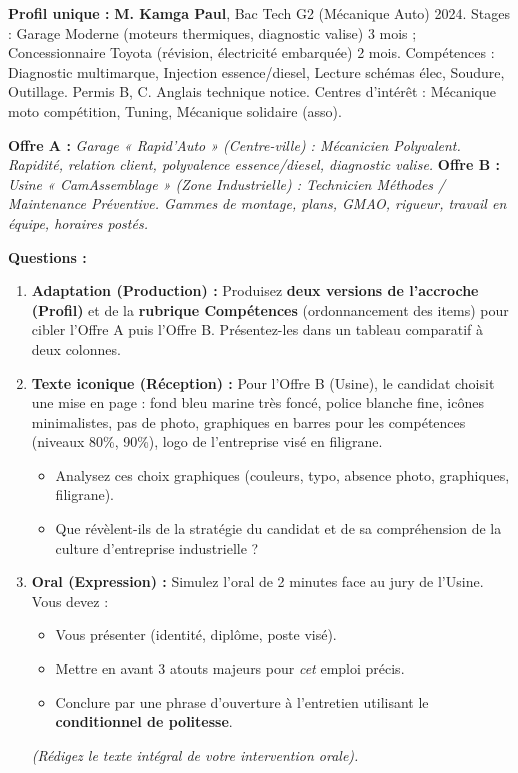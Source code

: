 \documentclass[11pt]{article}
\begin{document}
\begin{exercice}
\textbf{Profil unique :} \textbf{M. Kamga Paul}, Bac Tech G2 (Mécanique Auto) 2024. Stages : Garage Moderne (moteurs thermiques, diagnostic valise) 3 mois ; Concessionnaire Toyota (révision, électricité embarquée) 2 mois. Compétences : Diagnostic multimarque, Injection essence/diesel, Lecture schémas élec, Soudure, Outillage. Permis B, C. Anglais technique notice. Centres d'intérêt : Mécanique moto compétition, Tuning, Mécanique solidaire (asso).

\textbf{Offre A :} \emph{Garage « Rapid'Auto » (Centre-ville) : Mécanicien Polyvalent. Rapidité, relation client, polyvalence essence/diesel, diagnostic valise.}
\textbf{Offre B :} \emph{Usine « CamAssemblage » (Zone Industrielle) : Technicien Méthodes / Maintenance Préventive. Gammes de montage, plans, GMAO, rigueur, travail en équipe, horaires postés.}

\textbf{Questions :}
\begin{enumerate}
\item \textbf{Adaptation (Production) :} Produisez \textbf{deux versions de l'accroche (Profil)} et de la \textbf{rubrique Compétences} (ordonnancement des items) pour cibler l'Offre A puis l'Offre B. Présentez-les dans un tableau comparatif à deux colonnes.
\item \textbf{Texte iconique (Réception) :} Pour l'Offre B (Usine), le candidat choisit une mise en page : fond bleu marine très foncé, police blanche fine, icônes minimalistes, pas de photo, graphiques en barres pour les compétences (niveaux 80\%, 90\%), logo de l'entreprise visé en filigrane.
\begin{itemize}
\item Analysez ces choix graphiques (couleurs, typo, absence photo, graphiques, filigrane).
\item Que révèlent-ils de la stratégie du candidat et de sa compréhension de la culture d'entreprise industrielle ?
\end{itemize}
\item \textbf{Oral (Expression) :} Simulez l'oral de 2 minutes face au jury de l'Usine. Vous devez :
\begin{itemize}
\item Vous présenter (identité, diplôme, poste visé).
\item Mettre en avant 3 atouts majeurs pour \emph{cet} emploi précis.
\item Conclure par une phrase d'ouverture à l'entretien utilisant le \textbf{conditionnel de politesse}.
\end{itemize}
\textit{(Rédigez le texte intégral de votre intervention orale).}
\end{enumerate}
\end{exercice}
\end{document}

